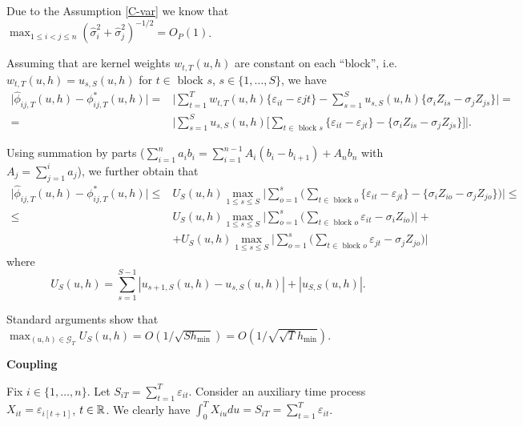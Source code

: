 \documentclass[a4paper,12pt]{article}
\begin{document}
Due to the Assumption \ref{C-var} we know that $\max_{1\le i < j \le n}(\widehat{\sigma}_i^{2} + \widehat{\sigma}^2_j)^{-1/2} =O_P(1)$.

Assuming that are kernel weights $w_{t, T}(u, h)$ are constant on each ``block'', i.e. $w_{t, T}(u, h) = u_{s, S}(u, h)$ for $t\in$ block $s$, $s \in \{1, \ldots, S\}$, we have
\begin{align*}
\big| \widehat{\phi}_{ij,T}(u,h) - \phi_{ij,T}^*(u,h) \big| =& \bigg| \sum_{t=1}^T w_{t, T}(u, h) \{\varepsilon_{it} - \varepsilon{jt}\} - \sum_{s=1}^S u_{s, S}(u, h) \{\sigma_i Z_{is} - \sigma_j Z_{js}\} \bigg| =\\
 =& \bigg| \sum_{s=1}^S u_{s, S}(u, h) \Big[\sum_{t \in \text{ block } s}\{\varepsilon_{it} - \varepsilon_{jt}\} - \{\sigma_i Z_{is} - \sigma_j Z_{js}\}\Big] \bigg|.
\end{align*}

Using summation by parts
($\sum_{i=1}^n a_i b_i = \sum_{i=1}^{n-1} A_i (b_i - b_{i+1}) + A_n b_n$ with $A_j = \sum_{j=1}^i a_j$),
we further obtain that 
\begin{equation}\label{eq-theo-stat-equality-res3}
	\begin{split}
		\big| \widehat{\phi}_{ij,T}(u,h) - \phi_{ij,T}^*(u,h) \big| \le &  U_S(u,h) \max_{1 \le s \le S} \bigg| \sum\limits_{o=1}^s \Big(\sum_{t \in \text{ block } o}\{\varepsilon_{it} - \varepsilon_{jt}\} - \{\sigma_i Z_{io} - \sigma_j Z_{jo}\}\Big) \bigg| \le \\
		\le & U_S(u,h) \max_{1 \le s \le S} \bigg| \sum\limits_{o=1}^s \Big(\sum_{t \in \text{ block } o}\varepsilon_{it} -  \sigma_i Z_{io}\Big) \bigg| +\\
		&+ U_S(u,h) \max_{1 \le s \le S} \bigg| \sum\limits_{o=1}^s \Big(\sum_{t \in \text{ block } o}\varepsilon_{jt} -  \sigma_j Z_{jo}\Big) \bigg|
		\end{split}
\end{equation}
where
\[ U_S(u,h) = \sum\limits_{s=1}^{S-1} |u_{s+1,S}(u,h) - u_{s,S}(u,h)| + |u_{S,S}(u,h)|. \]

Standard arguments show that $\max_{(u,h) \in \mathcal{G}_T} U_S(u,h) = O( 1/\sqrt{Sh_{\min}}) = O(1/\sqrt{\sqrt{T}h_{\min}})$.

\textbf{Coupling}

Fix $i \in \{1, \ldots, n\}$. Let $S_{iT} = \sum_{t=1}^T \varepsilon_{it}$. Consider an auxiliary time process $X_{it} = \varepsilon_{i[t+1]}$, $t \in \mathbb{R}$. We clearly have $\int_{0}^T X_{iu}du = S_{iT} = \sum_{t=1}^T \varepsilon_{it}$.
\end{document}
